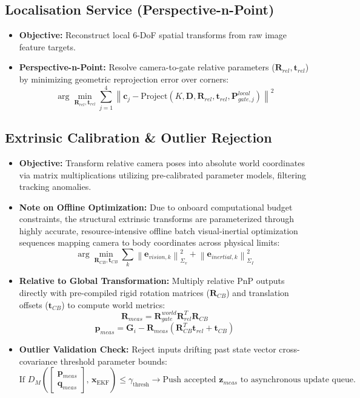 \documentclass{article}
\begin{document}
\subsection{Localisation Service (Perspective-n-Point)}
\begin{itemize}
    \item \textbf{Objective:} Reconstruct local 6-DoF spatial transforms from raw image feature targets.
    \item \textbf{Perspective-n-Point:} Resolve camera-to-gate relative parameters ($\mathbf{R}_{rel}, \mathbf{t}_{rel}$) by minimizing geometric reprojection error over corners:
    $$\arg\min_{\mathbf{R}_{rel}, \mathbf{t}_{rel}} \sum_{j=1}^{4} \left\| \mathbf{c}_j - \text{Project}(K, \mathbf{D}, \mathbf{R}_{rel}, \mathbf{t}_{rel}, \mathbf{P}_{gate, j}^{local}) \right\|^2$$
\end{itemize}

\subsection{Extrinsic Calibration \& Outlier Rejection}
\begin{itemize}
    \item \textbf{Objective:} Transform relative camera poses into absolute world coordinates via matrix multiplications utilizing pre-calibrated parameter models, filtering tracking anomalies.
    \item \textbf{Note on Offline Optimization:} Due to onboard computational budget constraints, the structural extrinsic transforms are parameterized through highly accurate, resource-intensive offline batch visual-inertial optimization sequences mapping camera to body coordinates across physical limits:
    $$\arg\min_{\mathbf{R}_{CB}, \mathbf{t}_{CB}} \sum_{k} \left\| \mathbf{e}_{vision, k} \right\|_{\Sigma_v}^2 + \left\| \mathbf{e}_{inertial, k} \right\|_{\Sigma_I}^2$$
    \item \textbf{Relative to Global Transformation:} Multiply relative PnP outputs directly with pre-compiled rigid rotation matrices ($\mathbf{R}_{CB}$) and translation offsets ($\mathbf{t}_{CB}$) to compute world metrics:
    $$\mathbf{R}_{meas} = \mathbf{R}_{gate}^{world} \mathbf{R}_{rel}^T \mathbf{R}_{CB}$$
    $$\mathbf{p}_{meas} = \mathbf{G}_i - \mathbf{R}_{meas} (\mathbf{R}_{CB}^T \mathbf{t}_{rel} + \mathbf{t}_{CB})$$
    \item \textbf{Outlier Validation Check:} Reject inputs drifting past state vector cross-covariance threshold parameter bounds:
    $$\text{If } D_M\left(\begin{bmatrix} \mathbf{p}_{meas} \\ \mathbf{q}_{meas} \end{bmatrix}, \, \mathbf{x}_{\text{EKF}}\right) \le \gamma_{\text{thresh}} \longrightarrow \text{Push accepted } \mathbf{z}_{meas} \text{ to asynchronous update queue.}$$
\end{itemize}
\end{document}
